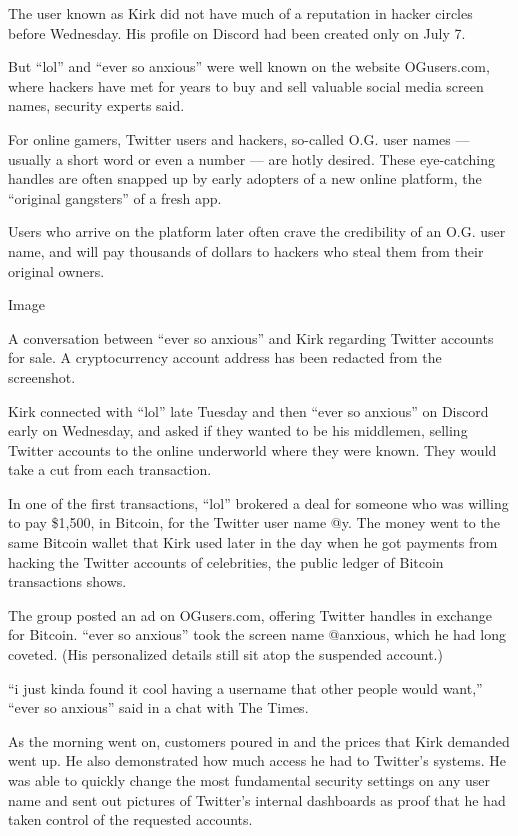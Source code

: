 The user known as Kirk did not have much of a reputation in hacker
circles before Wednesday. His profile on Discord had been created only
on July 7.

But ``lol'' and ``ever so anxious'' were well known on the website
OGusers.com, where hackers have met for years to buy and sell valuable
social media screen names, security experts said.

For online gamers, Twitter users and hackers, so-called O.G. user names
--- usually a short word or even a number --- are hotly desired. These
eye-catching handles are often snapped up by early adopters of a new
online platform, the ``original gangsters'' of a fresh app.

Users who arrive on the platform later often crave the credibility of an
O.G. user name, and will pay thousands of dollars to hackers who steal
them from their original owners.

Image

A conversation between ``ever so anxious'' and Kirk regarding Twitter
accounts for sale. A cryptocurrency account address has been redacted
from the screenshot.

Kirk connected with ``lol'' late Tuesday and then ``ever so anxious'' on
Discord early on Wednesday, and asked if they wanted to be his
middlemen, selling Twitter accounts to the online underworld where they
were known. They would take a cut from each transaction.

In one of the first transactions, ``lol'' brokered a deal for someone
who was willing to pay \$1,500, in Bitcoin, for the Twitter user name
@y. The money went to the same Bitcoin wallet that Kirk used later in
the day when he got payments from hacking the Twitter accounts of
celebrities, the public ledger of Bitcoin transactions shows.

The group posted an ad on OGusers.com, offering Twitter handles in
exchange for Bitcoin. ``ever so anxious'' took the screen name @anxious,
which he had long coveted. (His personalized details still sit atop the
suspended account.)

``i just kinda found it cool having a username that other people would
want,'' ``ever so anxious'' said in a chat with The Times.

As the morning went on, customers poured in and the prices that Kirk
demanded went up. He also demonstrated how much access he had to
Twitter's systems. He was able to quickly change the most fundamental
security settings on any user name and sent out pictures of Twitter's
internal dashboards as proof that he had taken control of the requested
accounts.

